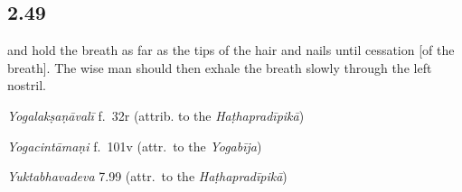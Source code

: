 \begin{ekdosis}
\subsection*{2.49}
\begin{translation}[hp02_049]
and hold the breath as far as the tips of the hair and nails until cessation [of the breath]. The wise man should then exhale the breath slowly through the left nostril.
\end{translation}


\begin{testimonia}[hp02_049]
\emph{Yogalakṣaṇāvalī} f.~32r (attrib. to the \emph{Haṭhapradīpikā})
\begin{versinnote}
\end{versinnote}

\emph{Yogacintāmaṇi} f.~101v (attr.~to the \emph{Yogabīja})
\begin{versinnote} 
\end{versinnote}

\emph{Yuktabhavadeva} 7.99 (attr.~to the \emph{Haṭhapradīpikā})

\begin{versinnote}
\end{versinnote}
\end{testimonia}

\begin{philcomm}[hp02_049]


\end{philcomm}
\end{ekdosis}
